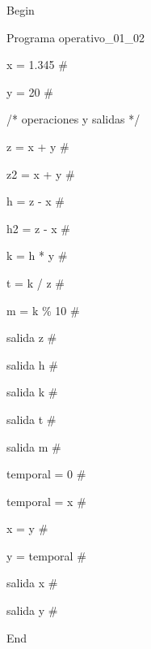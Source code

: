 \documentclass[10pt,a4paper]{article}
\begin{document}
\begingroup\setlength{\fboxsep}{6pt}
\noindent\colorbox{CodeBg}{%
\begin{minipage}{\dimexpr\linewidth-2\fboxsep\relax}
\ttfamily\fontsize{8.0}{10.5}\selectfont\raggedright
\setlength{\parindent}{0pt}\setlength{\parskip}{0pt}
\strut{}Begin\par
\strut{}Programa operativo\_01\_02\par
\strut{}\par
\strut{}x = 1.345 \#\par
\strut{}y = 20 \#\par
\strut{}\par
\strut{}/* operaciones y salidas */\par
\strut{}\par
\strut{}z = x + y \#\par
\strut{}z2 = x + y \#\par
\strut{}h = z - x \#\par
\strut{}h2 = z - x \#\par
\strut{}k = h * y \#\par
\strut{}t = k / z \#\par
\strut{}m = k \% 10 \#\par
\strut{}\par
\strut{}salida z \#\par
\strut{}salida h \#\par
\strut{}salida k \#\par
\strut{}salida t \#\par
\strut{}salida m \#\par
\strut{}\par
\strut{}temporal = 0 \#\par
\strut{}temporal = x \#\par
\strut{}x = y \#\par
\strut{}y = temporal \#\par
\strut{}\par
\strut{}salida x \#\par
\strut{}salida y \#\par
\strut{}\par
\strut{}End\par
\end{minipage}}\par\endgroup\vspace{5pt}
\end{document}
